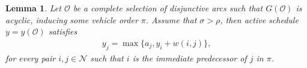 \documentclass[a4paper]{report}
\theoremstyle{definition}
\theoremstyle{plain}
\newtheorem{lemma}{Lemma}[chapter]
\begin{document}
\begin{lemma}\label{lb_lemma}
  Let $\mathcal{O}$ be a complete selection of disjunctive arcs such that
  $G(\mathcal{O})$ is acyclic, inducing some vehicle order $\pi$. Assume that
  $\sigma > \rho$, then active schedule $y = y(\mathcal{O})$ satisfies
\begin{align}
  \label{eq:lb_lemma}
  y_{j} = \max \{ a_{j}, y_i + w(i, j) \} ,
\end{align}
for every pair $i,j \in \mathcal{N}$ such that $i$ is the immediate predecessor
of $j$ in $\pi$.
\end{lemma}


\end{document}
